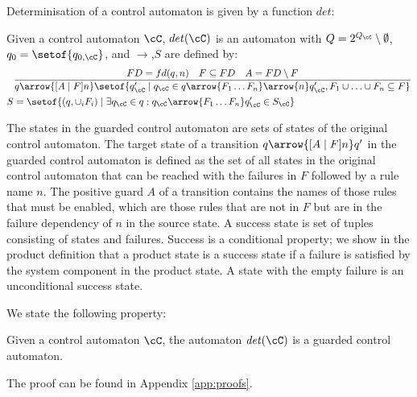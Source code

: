 Determinisation of a control automaton is given by a function $\mathit{det}$:

\begin{definition}\label{def:det}
Given a control automaton $\cC$, $det(\cC)$ is an automaton with $Q = 2^{Q_\cC} \setminus \emptyset$, $q_0 = \setof{ q_{0,\cC} }$, and ${\rightarrow}$,$S$ are defined by: \begin{align*}
&\frac
{FD = fd(q,n) \quad F \subseteq FD \quad A = FD \setminus F }
{q \arrow{[A \mid F]n} \setof{ q_{\cC}' \mid q_\cC \in q \arrow{F_1 \dotsc F_n}\arrow{n} q_{\cC}', F_1 \cup \dotsc \cup F_n \subseteq F } }\\
S &= \setof{(q, \cup_i F_i) \mid \exists q_{\cC} \in q: q_{\cC} \arrow{F_1 \dotsc F_n} q_{\cC}' \in S_{\cC} }
\end{align*}
\end{definition}

The states in the guarded control automaton are sets of states of the original control automaton. The target state of a transition $q \arrow{[A \mid F]n} q'$ in the guarded control automaton is defined as the set of all states in the original control automaton that can be reached with the failures in $F$ followed by a rule name $n$. The positive guard $A$ of a transition contains the names of those rules that must be enabled, which are those rules that are not in $F$ but are in the failure dependency of $n$ in the source state. 
A success state is set of tuples consisting of states and failures. Success is a conditional property; we show in the product definition that a product state is a success state if a failure is satisfied by the system component in the product state. A state with the empty failure is an unconditional success state. 

We state the following property:

\begin{proposition}\label{prop:detcisg}
Given a control automaton $\cC$, the automaton $\mathit{det}(\cC)$ is a guarded control automaton.
\end{proposition}

The proof can be found in Appendix \ref{app:proofs}. 

